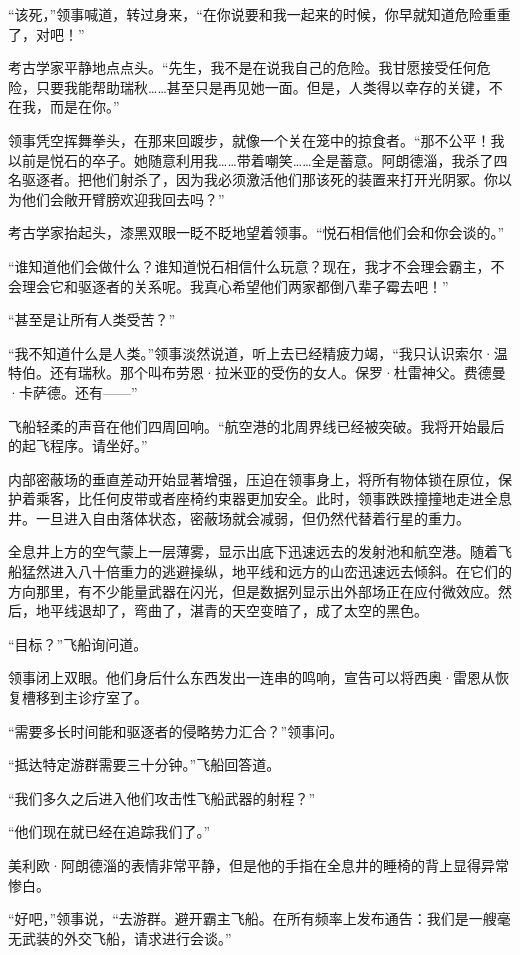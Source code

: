 \documentclass[AutoFakeBold=true]{book}
\begin{document}
``该死，''领事喊道，转过身来，``在你说要和我一起来的时候，你早就知道危险重重了，对吧！''

考古学家平静地点点头。``先生，我不是在说我自己的危险。我甘愿接受任何危险，只要我能帮助瑞秋……甚至只是再见她一面。但是，人类得以幸存的关键，不在我，而是在你。''

领事凭空挥舞拳头，在那来回踱步，就像一个关在笼中的掠食者。``那不公平！我以前是悦石的卒子。她随意利用我……带着嘲笑……全是蓄意。阿朗德淄，我杀了四名驱逐者。把他们射杀了，因为我必须激活他们那该死的装置来打开光阴冢。你以为他们会敞开臂膀欢迎我回去吗？''

考古学家抬起头，漆黑双眼一眨不眨地望着领事。``悦石相信他们会和你会谈的。''

``谁知道他们会做什么？谁知道悦石相信什么玩意？现在，我才不会理会霸主，不会理会它和驱逐者的关系呢。我真心希望他们两家都倒八辈子霉去吧！''

``甚至是让所有人类受苦？''

``我不知道什么是人类。''领事淡然说道，听上去已经精疲力竭，``我只认识索尔·温特伯。还有瑞秋。那个叫布劳恩·拉米亚的受伤的女人。保罗·杜雷神父。费德曼·卡萨德。还有——''

飞船轻柔的声音在他们四周回响。``航空港的北周界线已经被突破。我将开始最后的起飞程序。请坐好。''

内部密蔽场的垂直差动开始显著增强，压迫在领事身上，将所有物体锁在原位，保护着乘客，比任何皮带或者座椅约束器更加安全。此时，领事跌跌撞撞地走进全息井。一旦进入自由落体状态，密蔽场就会减弱，但仍然代替着行星的重力。

全息井上方的空气蒙上一层薄雾，显示出底下迅速远去的发射池和航空港。随着飞船猛然进入八十倍重力的逃避操纵，地平线和远方的山峦迅速远去倾斜。在它们的方向那里，有不少能量武器在闪光，但是数据列显示出外部场正在应付微效应。然后，地平线退却了，弯曲了，湛青的天空变暗了，成了太空的黑色。

``目标？''飞船询问道。

领事闭上双眼。他们身后什么东西发出一连串的鸣响，宣告可以将西奥·雷恩从恢复槽移到主诊疗室了。

``需要多长时间能和驱逐者的侵略势力汇合？''领事问。

``抵达特定游群需要三十分钟。''飞船回答道。

``我们多久之后进入他们攻击性飞船武器的射程？''

``他们现在就已经在追踪我们了。''

美利欧·阿朗德淄的表情非常平静，但是他的手指在全息井的睡椅的背上显得异常惨白。

``好吧，''领事说，``去游群。避开霸主飞船。在所有频率上发布通告：我们是一艘毫无武装的外交飞船，请求进行会谈。''
\end{document}
